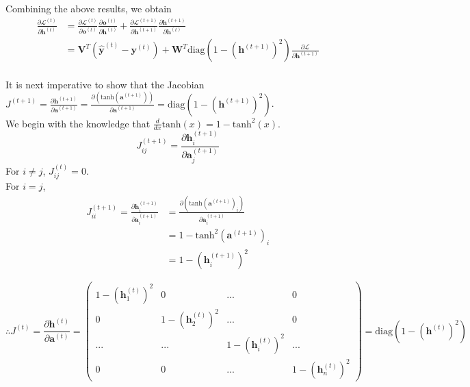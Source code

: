 \documentclass{article}
\numberwithin{equation}{section}
\begin{document}
Combining the above results, we obtain
\begin{equation}
\label{eqn:backward-ht}
\begin{split}
	\frac{\partial \mathcal{L}^{(t)}}{\partial \bm{h}^{(t)}}
		&= \frac{\partial \mathcal{L}^{(t)}}{\partial \bm{o}^{(t)}} \frac{\partial \bm{o}^{(t)}}{\partial \bm{h}^{(t)}} 
			+ \frac{\partial \mathcal{L}^{(t+1)}}{\partial \bm{h}^{(t+1)}} \frac{\partial \bm{h}^{(t+1)}}{\partial \bm{h}^{(t)}} \\
		&= \bm{V}^T(\hat{\bm{y}}^{(t)} - \bm{y}^{(t)}) + \bm{W}^T \text{diag}(1 - (\bm{h}^{(t+1)})^2) \frac{\partial \mathcal{L}}{\partial \bm{h}^{(t+1)}}
\end{split}
\end{equation}\\

It is next imperative to show that the Jacobian $J^{(t+1)} = \frac{\partial \bm{h}^{(t+1)}}{\partial \bm{a}^{(t+1)}} = \frac{\partial( \text{tanh}(\bm{a}^{(t+1)}))}{\partial \bm{a}^{(t+1)}} = \text{diag}(1 - (\bm{h}^{(t+1)})^2)$. \\

We begin with the knowledge that $\frac{d}{dx}\text{tanh}(x) = 1 - \text{tanh}^2(x)$.
	$$ J^{(t+1)}_{ij} = \frac{\partial \bm{h}^{(t+1)}_i}{\partial \bm{a}^{(t+1)}_j} $$
For $i \ne j$, $J^{(t)}_{ij} = 0$. \\
For $i = j$,
\begin{equation*}
\begin{split}
	J^{(t+1)}_{ii} = \frac{\partial \bm{h}^{(t+1)}_i}{\partial \bm{a}^{(t+1)}_i} 
		&= \frac{\partial( \text{tanh}(\bm{a}^{(t+1)})_i)}{\partial \bm{a}^{(t+1)}_i} \\
		&= 1 - \text{tanh}^2 (\bm{a}^{(t+1)})_i \\
		&= 1 - (\bm{h}^{(t+1)}_i)^2
\end{split}
\end{equation*}

	$$ \therefore J^{(t)} = \frac{\partial \bm{h}^{(t)}}{\partial \bm{a}^{(t)}} =
		\begin{pmatrix}
		1 - (\bm{h}_1^{(t)})^2 & 0 & ... & 0 \\ 
		0 & 1 - (\bm{h}_2^{(t)})^2 & ... & 0 \\ 
		... & ... & 1 - (\bm{h}_i^{(t)})^2 & ... \\ 
		0 & 0 & ... & 1 - (\bm{h}_n^{(t)})^2
		\end{pmatrix} 
		= \text{diag}(1 - (\bm{h}^{(t)})^2) $$\\
\end{document}
